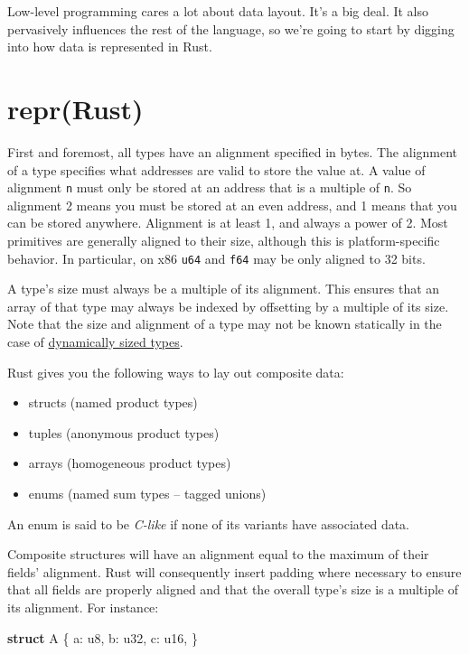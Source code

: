 \documentclass[a4paper,]{book}
\newenvironment{Shaded}{\begin{snugshade}}{\end{snugshade}}
\newcommand{\KeywordTok}[1]{\textcolor[rgb]{0.13,0.29,0.53}{\textbf{{#1}}}}
\newcommand{\DataTypeTok}[1]{\textcolor[rgb]{0.13,0.29,0.53}{{#1}}}
\newcommand{\NormalTok}[1]{{#1}}
\providecommand{\tightlist}{%
  \setlength{\itemsep}{0pt}\setlength{\parskip}{0pt}}
\begin{document}
Low-level programming cares a lot about data layout. It's a big deal. It
also pervasively influences the rest of the language, so we're going to
start by digging into how data is represented in Rust.

\section{repr(Rust)}\label{sec--repr-rust}

First and foremost, all types have an alignment specified in bytes. The
alignment of a type specifies what addresses are valid to store the
value at. A value of alignment \texttt{n} must only be stored at an
address that is a multiple of \texttt{n}. So alignment 2 means you must
be stored at an even address, and 1 means that you can be stored
anywhere. Alignment is at least 1, and always a power of 2. Most
primitives are generally aligned to their size, although this is
platform-specific behavior. In particular, on x86 \texttt{u64} and
\texttt{f64} may be only aligned to 32 bits.

A type's size must always be a multiple of its alignment. This ensures
that an array of that type may always be indexed by offsetting by a
multiple of its size. Note that the size and alignment of a type may not
be known statically in the case of
\protect\hyperlink{dynamically-sized-types-dsts}{dynamically sized
types}.

Rust gives you the following ways to lay out composite data:

\begin{itemize}
\tightlist
\item
  structs (named product types)
\item
  tuples (anonymous product types)
\item
  arrays (homogeneous product types)
\item
  enums (named sum types -- tagged unions)
\end{itemize}

An enum is said to be \emph{C-like} if none of its variants have
associated data.

Composite structures will have an alignment equal to the maximum of
their fields' alignment. Rust will consequently insert padding where
necessary to ensure that all fields are properly aligned and that the
overall type's size is a multiple of its alignment. For instance:

\begin{Shaded}
\begin{Highlighting}[]
\KeywordTok{struct} \NormalTok{A \{}
    \NormalTok{a: }\DataTypeTok{u8}\NormalTok{,}
    \NormalTok{b: }\DataTypeTok{u32}\NormalTok{,}
    \NormalTok{c: }\DataTypeTok{u16}\NormalTok{,}
\NormalTok{\}}
\end{Highlighting}
\end{Shaded}
\end{document}
